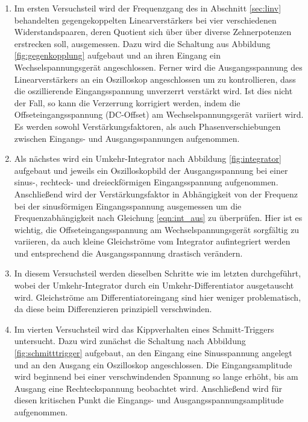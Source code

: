 \begin{enumerate}
  \item Im ersten Versuchsteil wird der Frequenzgang des in Abschnitt \ref{sec:linv} behandelten gegengekoppelten
  Linearverstärkers bei vier verschiedenen Widerstandspaaren, deren Quotient sich über über diverse
  Zehnerpotenzen erstrecken soll, ausgemessen. Dazu wird die Schaltung aus Abbildung \ref{fig:gegenkopplung} aufgebaut
  und an ihren Eingang ein Wechselspannungsgerät angeschlossen. Ferner wird die Ausgangsspannung des Linearverstärkers
  an ein Oszilloskop angeschlossen um zu kontrollieren, dass die oszillierende Eingangsspannung unverzerrt
  verstärkt wird. Ist dies nicht der Fall, so kann die Verzerrung korrigiert werden, indem die
  Offseteingangsspannung (DC-Offset) am Wechselspannungsgerät variiert wird. Es werden sowohl Verstärkungsfaktoren,
  als auch Phasenverschiebungen zwischen Eingangs- und Ausgangsspannungen aufgenommen.

  \item Als nächstes wird ein Umkehr-Integrator nach Abbildung \ref{fig:integrator} aufgebaut und jeweils ein
  Oszilloskopbild der Ausgangsspannung bei einer sinus-, rechteck- und dreieckförmigen Eingangsspannung aufgenommen.
  Anschließend wird der Verstärkungsfaktor in Abhängigkeit von der Frequenz bei der sinusförmigen Eingangsspannung
  ausgemessen um die Frequenzabhängigkeit nach Gleichung \eqref{eqn:int_aus} zu überprüfen.
  Hier ist es wichtig, die Offseteingangsspannung am Wechselspannungsgerät sorgfältig zu variieren, da
  auch kleine Gleichströme vom Integrator aufintegriert werden und entsprechend die Ausgangsspannung
  drastisch verändern.

  \item In diesem Versuchsteil werden dieselben Schritte wie im letzten durchgeführt, wobei der Umkehr-Integrator
  durch ein Umkehr-Differentiator ausgetauscht wird.
  Gleichströme am Differentiatoreingang sind hier weniger problematisch, da diese beim Differenzieren prinzipiell
  verschwinden.

  \item Im vierten Versuchsteil wird das Kippverhalten eines Schmitt-Triggers untersucht. Dazu wird
  zunächst die Schaltung nach Abbildung \ref{fig:schmitttrigger} aufgebaut, an den Eingang eine
  Sinusspannung angelegt und an den Ausgang ein Oszilloskop angeschlossen. Die Eingangsamplitude
  wird beginnend bei einer verschwindenden Spannung so lange erhöht, bis am Ausgang eine Rechteckspannung
  beobachtet wird. Anschließend wird für diesen kritischen Punkt die Eingangs- und Ausgangsspannungsamplitude
  aufgenommen.


\end{enumerate}
